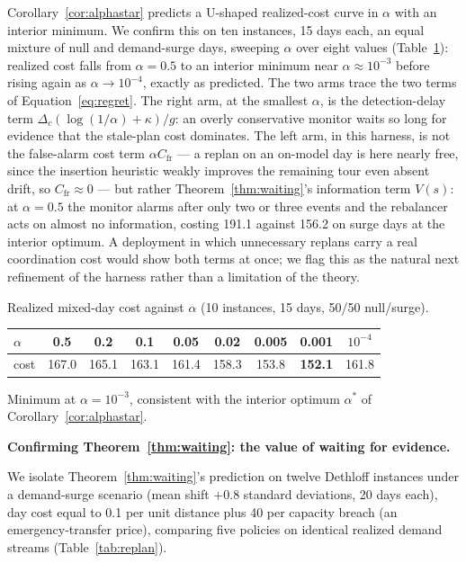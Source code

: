 \documentclass[trsc,dblanonrev]{informs4}
\begin{document}
Corollary~\ref{cor:alphastar} predicts a U-shaped realized-cost curve in
$\alpha$ with an interior minimum. We confirm this on ten instances,
15 days each, an equal mixture of null and demand-surge days, sweeping
$\alpha$ over eight values (Table~\ref{tab:alphasweep}): realized cost
falls from $\alpha = 0.5$ to an interior minimum near $\alpha \approx
10^{-3}$ before rising again as $\alpha \to 10^{-4}$, exactly as
predicted. The two arms trace the two terms of
Equation~\eqref{eq:regret}. The right arm, at the smallest $\alpha$, is
the detection-delay term $\Delta_c(\log(1/\alpha)+\kappa)/g$: an overly
conservative monitor waits so long for evidence that the stale-plan
cost dominates. The left arm, in this harness, is not the false-alarm
cost term $\alpha C_{\mathrm{fr}}$ --- a replan on an on-model day is
here nearly free, since the insertion heuristic weakly improves the
remaining tour even absent drift, so $C_{\mathrm{fr}} \approx 0$ ---
but rather Theorem~\ref{thm:waiting}'s information term $V(s)$: at
$\alpha = 0.5$ the monitor alarms after only two or three events and
the rebalancer acts on almost no information, costing 191.1 against
156.2 on surge days at the interior optimum. A deployment in which
unnecessary replans carry a real coordination cost would show both
terms at once; we flag this as the natural next refinement of the
harness rather than a limitation of the theory.

\begin{table}
\TABLE
{Realized mixed-day cost against $\alpha$ (10 instances, 15 days, 50/50
null/surge).\label{tab:alphasweep}}
{\footnotesize\begin{tabular}{@{}lcccccccc@{}}
\toprule
$\alpha$ & 0.5 & 0.2 & 0.1 & 0.05 & 0.02 & 0.005 & 0.001 & $10^{-4}$ \\
\midrule
cost & 167.0 & 165.1 & 163.1 & 161.4 & 158.3 & 153.8 & \textbf{152.1} & 161.8 \\
\bottomrule
\end{tabular}}
{Minimum at $\alpha = 10^{-3}$, consistent with the interior optimum
$\alpha^\ast$ of Corollary~\ref{cor:alphastar}.}
\end{table}

\textbf{Confirming Theorem~\ref{thm:waiting}: the value of waiting for evidence.}

We isolate Theorem~\ref{thm:waiting}'s prediction on twelve Dethloff
instances under a demand-surge scenario (mean shift $+0.8$ standard
deviations, 20 days each), day cost equal to 0.1 per unit distance plus
40 per capacity breach (an emergency-transfer price), comparing five
policies on identical realized demand streams
(Table~\ref{tab:replan}).
\end{document}
